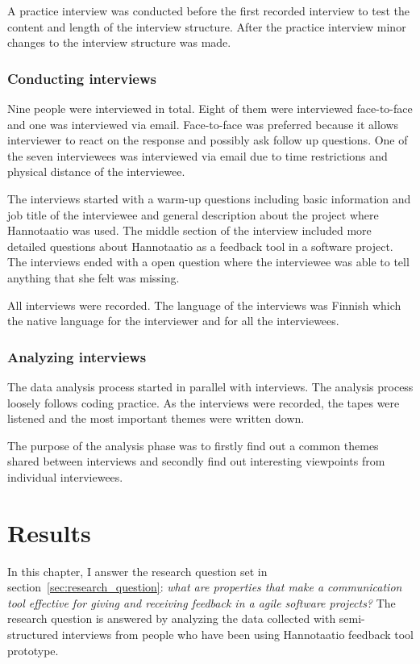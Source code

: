 \documentclass[english,12pt,a4paper,pdftex]{article}
\begin{document}
A practice interview was conducted before the first recorded interview to test the content and length of the interview structure. After the practice interview minor changes to the interview structure was made.

\subsubsection{Conducting interviews}

Nine people were interviewed in total. Eight of them were interviewed face-to-face and one was interviewed via email. Face-to-face was preferred because it allows interviewer to react on the response and possibly ask follow up questions. One of the seven interviewees was interviewed via email due to time restrictions and physical distance of the interviewee.

The interviews started with a warm-up questions including basic information and job title of the interviewee and general description about the project where Hannotaatio was used. The middle section of the interview included more detailed questions about Hannotaatio as a feedback tool in a software project. The interviews ended with a open question where the interviewee was able to tell anything that she felt was missing.

All interviews were recorded. The language of the interviews was Finnish which the native language for the interviewer and for all the interviewees.

\subsubsection{Analyzing interviews}

The data analysis process started in parallel with interviews. The analysis process loosely follows coding practice. As the interviews were recorded, the tapes were listened and the most important themes were written down. 

The purpose of the analysis phase was to firstly find out a common themes shared between interviews and secondly find out interesting viewpoints from individual interviewees.

\clearpage

\section{Results}
\label{sec:results}
\acresetall

In this chapter, I answer the research question set in section~\ref{sec:research_question}: \textit{what are properties that make a communication tool effective for giving and receiving feedback in a agile software projects?} The research question is answered by analyzing the data collected with semi-structured interviews from people who have been using Hannotaatio feedback tool prototype.
\end{document}
